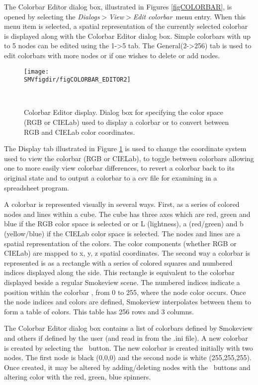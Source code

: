 \documentclass[11pt,twoside]{book}
\newcommand{\frameit}[1]{\fbox{\tt #1}}
\begin{document}
The Colorbar Editor dialog box, illustrated in Figures \ref{figCOLORBAR},
is opened by selecting the {\em Dialogs$>$View$>$Edit colorbar}\ menu entry. When this menu item is
selected, a spatial representation of the currently selected
colorbar is displayed along with the Colorbar Editor dialog box.
Simple colorbars with up to 5 nodes can be edited using the 1->5 tab.
The General(2->256) tab is used to edit
colorbars with more nodes or if one wishes to delete or add nodes.
\begin{figure}[bph]
\begin{center}
\texttt{[image: \\SMVfigdir/figCOLORBAR\_EDITOR2]}
\end{center}
\caption[Colorbar Editor display.]{Colorbar Editor display.
Dialog box for specifying the color space (RGB or CIELab) used to display a colorbar or to
convert between RGB and CIELab color coordinates.
}\ \label{figCOLORBAR2}
\end{figure}
The Display tab illustrated in Figure \ref{figCOLORBAR2} is used to
change the coordinate system used to view the colorbar (RGB or CIELab),
to toggle between colorbars allowing one to more easily view colorbar differences,
to revert a colorbar back to its original state and
to output a colorbar to a csv file for examining in a spreadsheet program.

A colorbar is represented visually in several ways.  First, as a series
of colored nodes and lines within a cube. The cube has three axes which are
red, green and blue if the RGB color space is selected or
or L (lightness), a (red/green) and b (yellow/blue) if the CIELab color space is selected.
The nodes and lines are a spatial representation of the colors.
The color components (whether RGB or CIELab) are mapped to x, y, z spatial coordinates.
The second way a colorbar is represented is as a rectangle with a series of colored squares and numbered indices displayed along the side. This rectangle is equivalent to the colorbar
displayed beside a regular Smokeview scene.  The numbered indices indicate
a position within the colorbar , from 0 to 255, where the node color occurs.
Once the node indices and colors are defined, Smokeview interpolates between them to
form a table of colors. This table has  256 rows and 3 columns.

The Colorbar Editor dialog box contains a list of colorbars
defined by Smokeview and others if defined by the user (and read in from the .ini file). A new
colorbar is created by selecting the \frameit{New}\ button. The
new colorbar is created initially with two nodes.
The first node is black (0,0,0) and the second node is white (255,255,255).
Once created, it may be altered by
adding/deleting nodes with the \frameit{Add/Delete}\ buttons and
altering color with the red, green, blue spinners.
\end{document}

